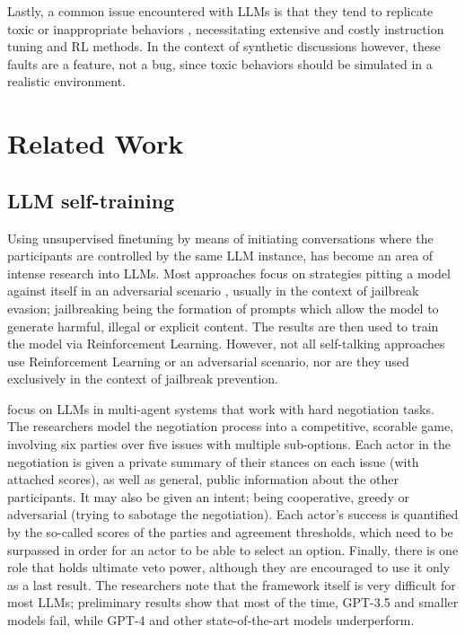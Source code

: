 Lastly, a common issue encountered with LLMs is that they tend to replicate toxic or inappropriate behaviors \cite{Birkun_Gautam_2023}, necessitating extensive and costly instruction tuning and \ac{RL} methods. In the context of synthetic discussions however, these faults are a feature, not a bug, since toxic behaviors should be simulated in a realistic environment.

\section{Related Work}
\label{sec:related:sec2}

\subsection{LLM self-training}
\label{sec:related:self-train}

Using unsupervised finetuning by means of initiating conversations where the participants are controlled by the same LLM instance, has become an area of intense research into LLMs. Most approaches focus on strategies pitting a model against itself in an adversarial scenario \cite{liu2024largelanguagemodelsagents, cheng2024selfplayingadversariallanguagegame, zheng2024optimalllmalignmentsusing}, usually in the context of jailbreak evasion; jailbreaking being the formation of prompts which allow the model to generate harmful, illegal or explicit content. The results are then used to train the model via Reinforcement Learning. However, not all self-talking approaches use Reinforcement Learning or an adversarial scenario, nor are they used exclusively in the context of jailbreak prevention.  

\citet{abdelnabi2024cooperationcompetitionmaliciousnessllmstakeholders} focus on LLMs in multi-agent systems that work with hard negotiation tasks. The researchers model the negotiation process into a competitive, scorable game, involving six parties over five issues with multiple sub-options. Each actor in the negotiation is given a private summary of their stances on each issue (with attached scores), as well as general, public information about the other participants. It may also be given an intent; being cooperative, greedy or adversarial (trying to sabotage the negotiation). Each actor's success is quantified by the so-called scores of the parties and agreement thresholds, which need to be surpassed in order for an actor to be able to select an option. Finally, there is one role that holds ultimate veto power, although they are encouraged to use it only as a last result. The researchers note that the framework itself is very difficult for most LLMs; preliminary results show that most of the time, GPT-3.5 and smaller models fail, while GPT-4 and other state-of-the-art models underperform.

